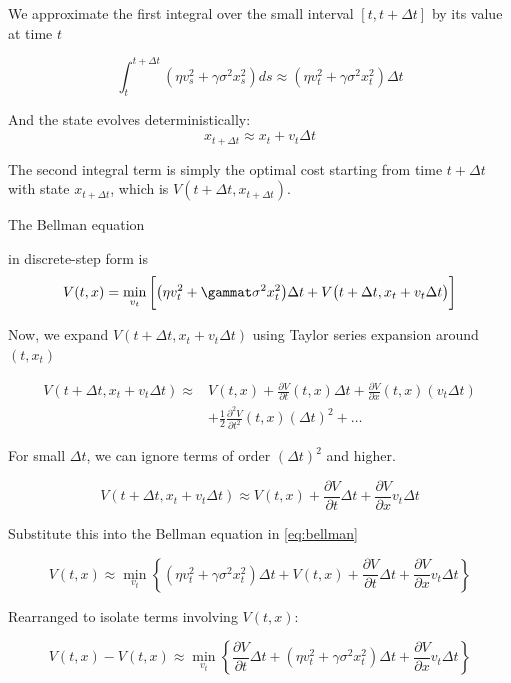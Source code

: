 We approximate the first integral over the small interval $[t,t+\Delta t]$ by its value at time $t$

$$\int_t^{t+\Delta t} (\eta v_s^2 + \gamma \sigma^2 x_s^2) ds \approx (\eta v_t^2 + \gamma \sigma^2 x_t^2) \Delta t$$

And the state evolves deterministically:
$$x_{t+\Delta t} \approx x_t + v_t \Delta t$$

The second integral term is simply the optimal cost starting from time 
$t+\Delta t$ with state $x_{t+\Delta t}$, which is $V(t+\Delta t, x_{t+\Delta t})$.

The Bellman equation {\cite{wiki:bellman-equation} in discrete-step form is
\begin{equation}\label{eq:bellman}
V(t,x) =  \min_{v_t}\bigg[\big(\eta v_t^2 + \gammat \sigma^2 x_t^2\big)\Delta t + V\big(t+\Delta t, x_t + v_t\Delta t\big)\bigg]
\end{equation}

Now, we expand $V(t+\Delta t, x_t + v_t \Delta t)$ using Taylor series expansion around $(t, x_t)$

\begin{equation}\label{taylorseries}
\begin{split}
V(t+\Delta t, x_t + v_t \Delta t) \approx& V(t, x) + \frac{\partial V}{\partial t}(t, x) \Delta t + \frac{\partial V}{\partial x}(t, x) (v_t \Delta t)\\
&+ \frac{1}{2} \frac{\partial^2 V}{\partial t^2}(t, x) (\Delta t)^2 + \dots
\end{split}
\end{equation}

For small $\Delta t$, we can ignore terms of order $(\Delta t)^2$ and higher.

$$V(t+\Delta t, x_t + v_t \Delta t) \approx V(t, x) + \frac{\partial V}{\partial t} \Delta t + \frac{\partial V}{\partial x} v_t \Delta t$$

Substitute this into the Bellman equation in \ref{eq:bellman}

$$V(t, x) \approx \min_{v_t} \left\{ (\eta v_t^2 + \gamma \sigma^2 x_t^2) \Delta t + V(t, x) + \frac{\partial V}{\partial t} \Delta t + \frac{\partial V}{\partial x} v_t \Delta t \right\}$$

Rearranged to isolate terms involving $V(t, x)$:

$$V(t, x) - V(t, x) \approx \min_{v_t} \left\{ \frac{\partial V}{\partial t} \Delta t + (\eta v_t^2 + \gamma \sigma^2 x_t^2) \Delta t + \frac{\partial V}{\partial x} v_t \Delta t \right\}$$

}
